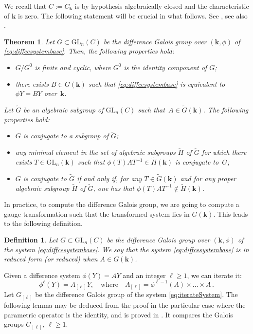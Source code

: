 \documentclass[a4paper,11pt]{amsart}
\renewcommand{\geq}{\geqslant}
\newcommand{\GL}{\operatorname{GL}}
\newtheorem{theo}[thm]{Theorem}
\newtheorem{defn}[thm]{Definition}
\def\k{\mathbf{k}}
\def\GL{\mathrm{GL}}
\begin{document}
We recall that $C:= C_{\k}$ is by hypothesis algebraically closed and the characteristic of $\k$ is zero. 
The following statement will be crucial in what follows.  See \cite[Propositions~1.20 and 1.21]{van2006galois}, see also  \cite[Theorem 2.4]{dreyfus2015galois}.  
\begin{theo}
\label{theo:reduced form}
Let $G \subset \GL_{n}(C)$ be the difference Galois group over $(\k,\phi)$ of \eqref{eq:diffcesystembase}. 
Then, the following properties hold:
\begin{itemize}
\item $G/G^0$ is finite and cyclic, where $G^0$ is the identity component of $G$;
\item there exists $B \in G(\k)$ such that \eqref{eq:diffcesystembase} is equivalent to $\phi Y=BY$ over~$\k$. 
\end{itemize}
Let $\widetilde{G}$ be an algebraic subgroup of $\GL_{n}(C)$ such that~$A\in \widetilde{G}(\k)$. The following properties hold:
\begin{itemize}
\item $G$ is conjugate to a subgroup of $\widetilde{G}$;
\item any minimal element in the set of algebraic subgroups $\widetilde{H}$ of $\widetilde{G}$ for which there exists 
$T\in \GL_{n}(\k)$ such that $\phi(T)AT^{-1}\in \widetilde{H}(\k)$ is conjugate to~$G$;
\item $G$ is conjugate to $\widetilde{G}$ if and only if, for any $T\in  \widetilde{G}(\k)$ and for any proper algebraic subgroup $\widetilde{H}$ of $\widetilde{G}$, 
one has that $\phi(T)AT^{-1}\notin \widetilde{H}(\k)$.
\end{itemize}
\end{theo}

In practice, to compute the difference Galois group, we are going to compute a gauge transformation such that the transformed system lies in $G(\k)$.
This leads to the following definition.  

\begin{defn}
Let $G \subset \GL_{n}(C)$ be the difference Galois group over $(\k,\phi)$ of the system \eqref{eq:diffcesystembase}. We say that the system \eqref{eq:diffcesystembase} is \emph{in reduced form} (or \emph{reduced}) when $A\in G(\k)$.  
\end{defn} 

Given a difference system $\phi(Y)=AY$ and an integer $\ell\geq 1$,  we can iterate it: \begin{equation}
    \label{eq:iterateSystem}
    \phi^{\ell}(Y)=A_{[\ell]}Y, \quad  \text{where} \quad  A_{[\ell]}=\phi^{\ell-1}(A)\times \dots \times A\, .
\end{equation}
Let $G_{[\ell]}$ be the difference Galois group of the system \eqref{eq:iterateSystem}. 
The following lemma may be deduced from the proof \cite[Proposition~4.6]{dreyfus2021functional} in the particular case where the parametric operator is the identity,  and is proved in  \cite[Proposition~4.10]{adamczewski2021hypertranscendence}.
It compares the Galois groups $G_{[\ell]}$,  $\ell \geq 1$. 
\end{document}
